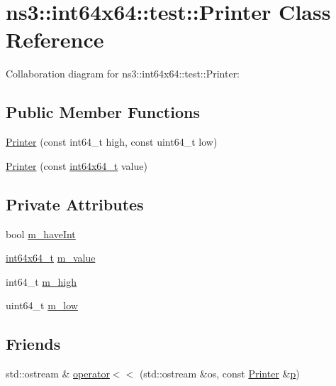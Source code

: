 \hypertarget{classns3_1_1int64x64_1_1test_1_1Printer}{}\section{ns3\+:\+:int64x64\+:\+:test\+:\+:Printer Class Reference}
\label{classns3_1_1int64x64_1_1test_1_1Printer}


Collaboration diagram for ns3\+:\+:int64x64\+:\+:test\+:\+:Printer\+:
\subsection*{Public Member Functions}
\begin{DoxyCompactItemize}
\item 
\hyperlink{classns3_1_1int64x64_1_1test_1_1Printer_aabc1fd55a428ffd7a08e96c02e3b6e20}{Printer} (const int64\+\_\+t high, const uint64\+\_\+t low)
\item 
\hyperlink{classns3_1_1int64x64_1_1test_1_1Printer_a899bd5fd0f6ad8fa267a051f64f004c2}{Printer} (const \hyperlink{classint64x64__t}{int64x64\+\_\+t} value)
\end{DoxyCompactItemize}
\subsection*{Private Attributes}
\begin{DoxyCompactItemize}
\item 
bool \hyperlink{classns3_1_1int64x64_1_1test_1_1Printer_a525019a296c58b0649ed75f7f0c11405}{m\+\_\+have\+Int}
\item 
\hyperlink{classint64x64__t}{int64x64\+\_\+t} \hyperlink{classns3_1_1int64x64_1_1test_1_1Printer_a0d040cf4df463b1161d19a185f7930a9}{m\+\_\+value}
\item 
int64\+\_\+t \hyperlink{classns3_1_1int64x64_1_1test_1_1Printer_a73c042edda613cf91f22e0c76ccc0bfe}{m\+\_\+high}
\item 
uint64\+\_\+t \hyperlink{classns3_1_1int64x64_1_1test_1_1Printer_abc8124eb64bf1309dd8e80c04ff44485}{m\+\_\+low}
\end{DoxyCompactItemize}
\subsection*{Friends}
\begin{DoxyCompactItemize}
\item 
std\+::ostream \& \hyperlink{classns3_1_1int64x64_1_1test_1_1Printer_acc5b790ddf9dc527a26fcb565aa4aec3}{operator$<$$<$} (std\+::ostream \&os, const \hyperlink{classns3_1_1int64x64_1_1test_1_1Printer}{Printer} \&\hyperlink{lte__link__budget__x2__handover__measures_8m_ac9de518908a968428863f829398a4e62}{p})
\end{DoxyCompactItemize}


